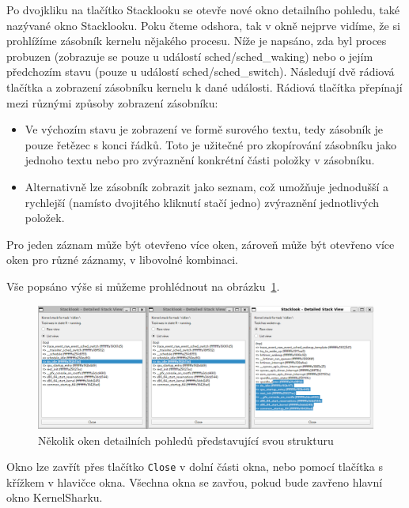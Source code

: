 Po dvojkliku na tlačítko Stacklooku se otevře nové okno detailního pohledu, také nazývané okno Stacklooku. Poku čteme odshora, tak v okně nejprve vidíme, že si prohlížíme zásobník kernelu nějakého procesu. Níže je napsáno, zda byl proces probuzen (zobrazuje se pouze u událostí sched/sched\_waking) nebo o jejím předchozím stavu (pouze u událostí sched/sched\_switch). Následují dvě rádiová tlačítka a zobrazení zásobníku kernelu k dané události. Rádiová tlačítka přepínají mezi různými způsoby zobrazení zásobníku:
\begin{itemize}
  \item Ve výchozím stavu je zobrazení ve formě surového textu, tedy zásobník je pouze řetězec s konci řádků. Toto je užitečné pro zkopírování zásobníku jako jednoho textu nebo pro zvýraznění konkrétní části položky v zásobníku.
  \item Alternativně lze zásobník zobrazit jako seznam, což umožňuje jednodušší a rychlejší (namísto dvojitého kliknutí stačí jedno) zvýraznění jednotlivých položek.
\end{itemize}

Pro jeden záznam může být otevřeno více oken, zároveň může být otevřeno více oken pro různé záznamy, v libovolné kombinaci.

Vše popsáno výše si můžeme prohlédnout na obrázku~\ref{SlMultipleWindowsMultipleViewsTwoSameEntires}.

\begin{figure}[p]\centering
    \includegraphics[width=140mm]{img/Stacklook/SlMultipleWindowsMultipleViewsTwoSameEntires}
    \caption{Několik oken detailních pohledů představující svou strukturu}
    \label{SlMultipleWindowsMultipleViewsTwoSameEntires}
\end{figure}

Okno lze zavřít přes tlačítko \texttt{Close} v dolní části okna, nebo pomocí tlačítka s křížkem v hlavičce okna. Všechna okna se zavřou, pokud bude zavřeno hlavní okno KernelSharku.


